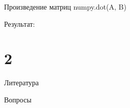 \documentclass[12pt]{beamer}
\begin{document}
\begin{frame}{Произведение матриц numpy.dot(A, B)}

Результат: \\

\end{frame}



\part{2}

\begin{frame}[t]{Литература}

\end{frame}


\begin{frame}[t]{Вопросы}
\vspace{0.7cm}
 \\
\end{frame}
\end{document}
